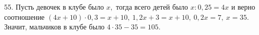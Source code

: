 55. Пусть девочек в клубе было $x,$ тогда всего детей было $x:0,25=4x$ и верно соотношение $(4x+10)\cdot0,3=x+10,\ 1,2x+3=x+10,\ 0,2x=7,\ x=35.$ Значит, мальчиков в клубе было $4\cdot35-35=105.$\\
